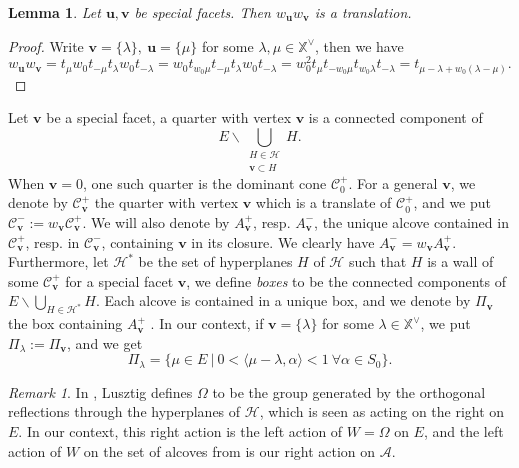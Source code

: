 \documentclass[11pt]{amsart}
\theoremstyle{plain}
\newtheorem{lem}[thm]{Lemma}
\theoremstyle{remark}
\newtheorem{rem}[thm]{Remark}
\numberwithin{equation}{section}
\begin{document}
	\begin{lem}\label{translation}
		Let $\mathbf{u},\mathbf{v}$ be special facets. Then $w_\mathbf{u}w_{\mathbf{v}}$ is a translation.
	\end{lem} 
	\begin{proof}
		Write $\mathbf{v}=\{\lambda\},~\mathbf{u}=\{\mu\}$ for some $\lambda,\mu\in\mathbb{X}^\vee$, then we have
		$$w_\mathbf{u}w_\mathbf{v}=t_{\mu}w_0t_{-\mu}t_{\lambda}w_0t_{-\lambda}=w_0t_{w_0\mu}t_{-\mu}t_{\lambda}w_0t_{-\lambda}=w_0^2t_{\mu}t_{-w_0\mu}t_{w_0\lambda}t_{-\lambda}=t_{\mu-\lambda+w_0(\lambda-\mu)}.$$
	\end{proof}
	
	Let $\mathbf{v}$ be a special facet, a quarter with vertex $\mathbf{v}$ is a connected component of 
	$$E\backslash\bigcup_{\substack{H\in\mathscr{H}\\\mathbf{v}\subset H}}H.$$
	When $\mathbf{v}={0}$, one such quarter is the dominant cone $\mathscr{C}^+_{0}$. For a general $\mathbf{v}$, we denote by $\mathscr{C}^+_\mathbf{v}$ the quarter with vertex $\mathbf{v}$ which is a translate of $\mathscr{C}^+_{0}$, and we put $\mathscr{C}^-_\mathbf{v}:=w_\mathbf{v}\mathscr{C}^+_\mathbf{v}$. We will also denote by $A^+_\mathbf{v}$, resp. $A^-_\mathbf{v}$, the unique alcove contained in $\mathscr{C}^+_\mathbf{v}$, resp. in $\mathscr{C}^-_\mathbf{v}$, containing $\mathbf{v}$ in its closure. We clearly have $A^-_\mathbf{v}=w_\mathbf{v}A^+_\mathbf{v}$.  Furthermore, let $\mathscr{H}^*$ be the set of hyperplanes $H$ of $\mathscr{H}$ such that $H$ is a wall of some $\mathscr{C}^+_\mathbf{v}$ for a special facet $\mathbf{v}$, we define \textit{boxes} to be the connected components of $E\backslash\bigcup_{H\in\mathscr{H}^*}H$. Each alcove is contained in a unique box, and we denote by $\Pi_\mathbf{v}$ the box containing $A^+_\mathbf{v}$ . In our context, if $\mathbf{v}=\{\lambda\}$ for some $\lambda\in\mathbb{X}^\vee$, we put $\Pi_{\lambda}:=\Pi_\mathbf{v}$, and we get 
	\begin{equation}\label{box}
		\Pi_{\lambda}=\{\mu\in E~|~0<\langle\mu-\lambda,\alpha\rangle<1~\forall \alpha\in S_0\}.
	\end{equation} 
	\begin{rem}\label{action compat}
		In \cite{LUSZTIG1980121}, Lusztig defines $\Omega$ to be the group generated by the orthogonal reflections through the hyperplanes of $\mathscr{H}$, which is seen as acting on the right on $E$. In our context, this right action is the left action of $W=\Omega$ on $E$, and the left action of $W$ on the set of alcoves from \cite{LUSZTIG1980121} is our right action on $\mathcal{A}$.
	\end{rem}
\end{document}

